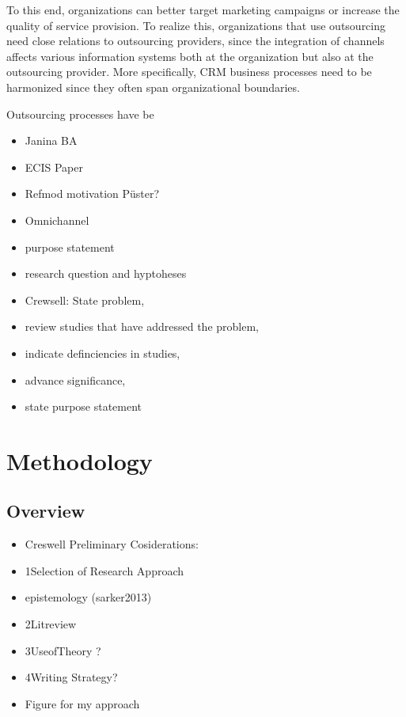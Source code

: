 To this end, organizations can better target marketing campaigns or increase the quality of service provision. To realize this, organizations that use outsourcing need close relations to outsourcing providers, since the integration of channels affects various information systems both at the organization but also at the outsourcing provider. More specifically, CRM business processes need to be harmonized since they often span organizational boundaries.


 

Outsourcing processes have be

	\begin{itemize}
		\item Janina BA
		\item ECIS Paper
		\item Refmod motivation Püster?
		\item Omnichannel 
		\item purpose statement
		\item research question and hyptoheses
	\end{itemize}

	\begin{itemize}
		\item Crewsell: State problem, 
		\item review studies that have addressed the problem,
		\item  indicate definciencies in studies, 
		\item advance significance, 
		\item state purpose statement
	\end{itemize}
\chapter{Methodology}
	\section{Overview}
		\begin{itemize}
			\item Creswell Preliminary Cosiderations:
			\item 1Selection of Research Approach
			\item epistemology (sarker2013)
			\item 2Litreview
			\item 3UseofTheory ?
			\item 4Writing Strategy?
			\item Figure for my approach
		\end{itemize}
	
